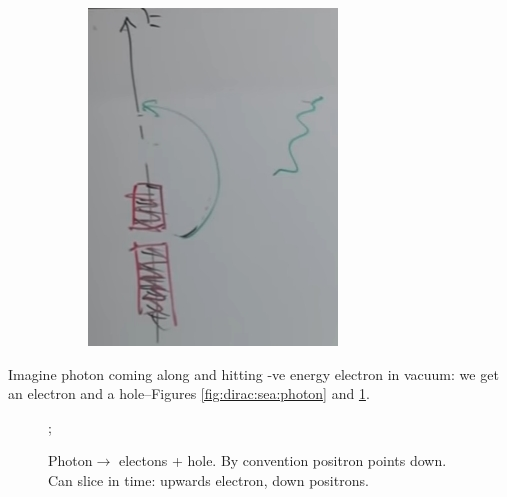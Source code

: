 \documentclass[]{article}
\begin{document}
\begin{figure}[H]
\begin{center}
\begin{subfigure}[t]{0.3\textwidth}
\begin{center}
				\includegraphics[width=\textwidth]{aqm-10-dirac-sea-photon}
			\end{center}
	\end{subfigure}
	\end{center}
\end{figure}

Imagine photon coming along and hitting -ve energy electron in vacuum: we get an electron and a hole--Figures \ref{fig:dirac:sea:photon} and \ref{photon:dirac}.

\begin{figure}[H]
	\begin{center}
		\caption[Photon$\rightarrow$ electrons + hole]{Photon$\rightarrow$ electons + hole. By convention positron points down. Can slice in time: upwards electron, down positrons.}\label{photon:dirac}
		;
	\end{center}
\end{figure}
\end{document}
